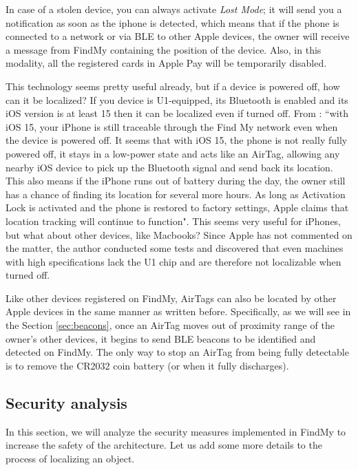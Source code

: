 \documentclass[english]{article}
\begin{document}
In case of a stolen device, you can always activate \textit{Lost Mode}; it will send you a notification as soon as the iphone is detected, which means that if the phone is connected to a network or via BLE to other Apple devices, the owner will receive a message from FindMy containing the position of the device. Also, in this modality, all the registered cards in Apple Pay will be temporarily disabled.

This technology seems pretty useful already, but if a device is powered off, how can it be localized? If you device is U1-equipped, its Bluetooth is enabled and its iOS version is at least 15 then it can be localized even if turned off. From \cite{Mayo_2021}: ``with iOS 15, your iPhone is still traceable through the Find My network even when the device is powered off. 
It seems that with iOS 15, the phone is not really fully powered off, it stays in a low-power state and acts like an AirTag, allowing any nearby iOS device to pick up the Bluetooth signal and send back its location.
This also means if the iPhone runs out of battery during the day, the owner still has a chance of finding its location for several more hours. As long as Activation Lock is activated and the phone is restored to factory settings, Apple claims that location tracking will continue to function". This seems very useful for iPhones, but what about other devices, like Macbooks? Since Apple has not commented on the matter, the author conducted some tests and discovered that even machines with high specifications lack the U1 chip and are therefore not localizable when turned off. 

Like other devices registered on FindMy, AirTags can also be located by other Apple devices in the same manner as written before. Specifically, as we will see in the Section \ref{sec:beacons}, once an AirTag moves out of proximity range of the owner's other devices, it begins to send BLE beacons to be identified and detected on FindMy. The only way to stop an AirTag from being fully detectable is to remove the CR2032 coin battery (or when it fully discharges).

\subsection{Security analysis}
In this section, we will analyze the security measures implemented in FindMy to increase the safety of the architecture. Let us add some more details to the process of localizing an object.
\end{document}
